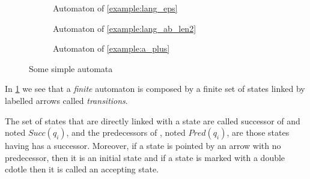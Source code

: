 \begin{figure}
    \centering
    \begin{subfigure}[b]{0.45\textwidth}
        \centering
        \caption{Automaton of \cref{example:lang_eps}}
    \end{subfigure}
    \begin{subfigure}[b]{0.45\textwidth}
        \centering
        \caption{Automaton of \cref{example:lang_ab_len2}}
    \end{subfigure}
    \begin{subfigure}[b]{0.45\textwidth}
        \centering
        \caption{Automaton of \cref{example:a_plus}}
    \end{subfigure}
    \caption{Some simple automata}
    \label{simple_automata}
\end{figure}

In \cref{simple_automata} we see that a \textit{finite} automaton is composed by a finite set of states linked by labelled arrows called \textit{transitions}.

The set of states that are directly linked with a state \qi{} are called successor of \qi{} and noted $Succ(q_i)$, and the predecessors of \qi{}, noted $Pred(q_i)$, are those states having \qi{} has a successor. Moreover, if a state is pointed by an arrow with no predecessor, then it is an initial state and if a state is marked with a double cdotle then it is called an accepting state.

